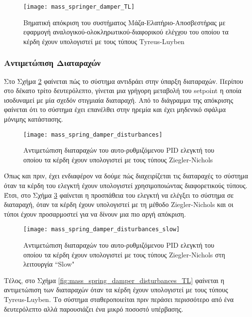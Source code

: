 \begin{figure}[h]
  \centering
  \texttt{[image: mass\_springer\_damper\_TL]}
  \caption{Βηματική απόκριση του συστήματος Μάζα-Ελατήριο-Αποσβεστήρας με εφαρμογή αναλογικού-ολοκληρωτικού-διαφορικού ελέγχου του οποίου τα κέρδη έχουν υπολογιστεί με τους τύπους Tyreus-Luyben}
  \label{fig:mass_springer_damper_TL}
\end{figure}



\subsubsection{Αντιμετώπιση Διαταραχών}
Στο Σχήμα \ref{fig:mass_spring_damper_disturbances} φαίνεται πώς το σύστημα αντιδράει στην ύπαρξη διαταραχών. Περίπου στο δέκατο τρίτο δευτερόλεπτο, γίνεται μια γρήγορη μεταβολή του setpoint η οποία ισοδυναμεί με μία σχεδόν στιγμιαία διαταραχή. Από το διάγραμμα της απόκρισης φαίνεται ότι το σύστημα έχει επανέλθει στην ηρεμία και έχει μηδενικό σφάλμα μόνιμης κατάστασης. 

\begin{figure}[h]
  \centering
  \texttt{[image: mass\_spring\_damper\_disturbances]}
  \caption{Αντιμετώπιση διαταραχών του αυτο-ρυθμιζόμενου PID ελεγκτή του οποίου τα κέρδη έχουν υπολογιστεί με τους τύπους Ziegler-Nichols}
  \label{fig:mass_spring_damper_disturbances}
\end{figure}

Όπως και πριν, έχει ενδιαφέρον να δούμε πώς διαχειρίζεται τις διαταραχές το σύστημα όταν τα κέρδη του ελεγκτή έχουν υπολογιστεί χρησιμοποιώντας διαφορετικούς τύπους. Έτσι, στο Σχήμα \ref{fig:mass_spring_damper_disturbances_slow} φαίνεται η προσπάθεια του ελεγκτή να ελέγξει το σύστημα σε διαταραχή, όταν τα κέρδη έχουν υπολογιστεί με τη μέθοδο Ziegler-Nichols και οι τύποι έχουν προσαρμοστεί για να δίνουν μια πιο αργή απόκριση.

\begin{figure}[h]
  \centering
  \texttt{[image: mass\_spring\_damper\_disturbances\_slow]}
  \caption{Αντιμετώπιση διαταραχών του αυτο-ρυθμιζόμενου PID ελεγκτή του οποίου τα κέρδη έχουν υπολογιστεί με τους τύπους Ziegler-Nichols στη λειτουργία ``Slow"}
  \label{fig:mass_spring_damper_disturbances_slow}
\end{figure}

Τέλος, στο Σχήμα \ref{fig:mass_spring_damper_disturbances_TL} φαίνεται η αντιμετώπιση των διαταραχών όταν τα κέρδη έχουν υπολογιστεί με τους τύπους Tyreus-Luyben. Το σύστημα σταθεροποιείται πριν περάσει περισσότερο από ένα δευτερόλεπτο αλλά παρουσιάζει ένα μικρό ποσοστό υπέρβασης.

